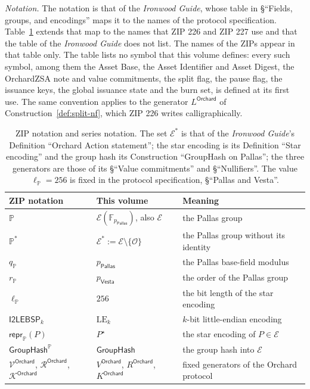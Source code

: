 \documentclass[11pt,a4paper]{article}
\theoremstyle{definition}
\newcommand{\F}{\mathbb{F}}
\newcommand{\Pallas}{\ensuremath{\mathsf{Pallas}}}
\newcommand{\Vesta}{\ensuremath{\mathsf{Vesta}}}
\newcommand{\Ep}{\ensuremath{\mathcal{E}}}
\newcommand{\GroupHash}{\ensuremath{\mathsf{GroupHash}}}
\begin{document}
\emph{Notation.} The notation is that of the \emph{Ironwood Guide}, whose
table in \S``Fields, groups, and encodings'' maps it to the names of the
protocol specification. Table~\ref{tab:notation} extends that map to the
names that ZIP 226 and ZIP 227 use and that the table of the
\emph{Ironwood Guide} does not list. The names of the ZIPs appear in that
table only. The table lists no symbol that this volume defines: every such
symbol, among them the Asset Base, the Asset Identifier and Asset Digest,
the OrchardZSA note and value commitments, the split flag, the pause flag,
the issuance keys, the global issuance state and the burn set, is defined at
its first use. The same convention applies to the generator
$L^{\mathsf{Orchard}}$ of Construction~\ref{def:split-nf}, which ZIP 226
writes calligraphically.

\begin{table}[ht]
\centering\small
\begin{tabular}{@{}lll@{}}
\toprule
ZIP notation & This volume & Meaning \\
\midrule
$\mathbb{P}$ & $\Ep(\F_{p_{\Pallas}})$, also $\Ep$ & the Pallas group \\
$\mathbb{P}^{*}$ & $\Ep^{*} := \Ep \setminus \{\mathcal{O}\}$
  & the Pallas group without its identity \\
$q_{\mathbb{P}}$ & $p_{\Pallas}$ & the Pallas base-field modulus \\
$r_{\mathbb{P}}$ & $p_{\Vesta}$ & the order of the Pallas group \\
$\ell_{\mathbb{P}}$ & $256$ & the bit length of the star encoding \\
$\mathsf{I2LEBSP}_k$ & $\mathrm{LE}_k$ & $k$-bit little-endian encoding \\
$\mathsf{repr}_{\mathbb{P}}(P)$ & $P^{\star}$ & the star encoding of
  $P \in \Ep$ \\
$\mathsf{GroupHash}^{\mathbb{P}}$ & $\GroupHash$ & the group hash into
  $\Ep$ \\
$\mathcal{V}^{\mathsf{Orchard}}$, $\mathcal{R}^{\mathsf{Orchard}}$,
  $\mathcal{K}^{\mathsf{Orchard}}$
  & $V^{\mathsf{Orchard}}$, $R^{\mathsf{Orchard}}$, $K^{\mathsf{Orchard}}$
  & fixed generators of the Orchard protocol \\
\bottomrule
\end{tabular}
\caption{ZIP notation and series notation. The set $\Ep^{*}$ is that of
the \emph{Ironwood Guide}'s Definition ``Orchard Action statement''; the
star encoding is its Definition ``Star encoding'' and the group hash its
Construction ``GroupHash on Pallas''; the three generators are those of
its \S``Value commitments'' and \S``Nullifiers''. The value
$\ell_{\mathbb{P}} = 256$ is fixed in the protocol specification,
\S``Pallas and Vesta''.}
\label{tab:notation}
\end{table}
\end{document}
